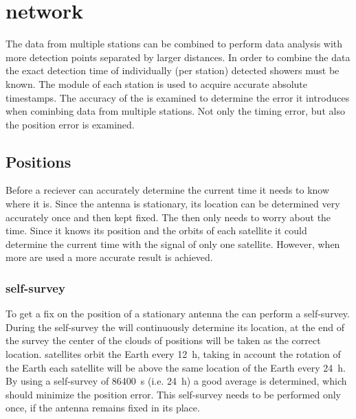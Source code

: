 \chapter{\hisparc network}
\label{ch:cluster}

The data from multiple \hisparc stations can be combined to perform data analysis with more detection points separated by larger distances. In order to combine the data the exact detection time of individually (per station) detected showers must be known. The \gps module of each station is used to acquire accurate absolute timestamps. The accuracy of the \gps is examined to determine the error it introduces when cominbing data from multiple stations. Not only the timing error, but also the position error is examined.


\section{Positions}

Before a \gps reciever can accurately determine the current time it needs to know where it is. Since the \gps antenna is stationary, its location can be determined very accurately once and then kept fixed. The \gps then only needs to worry about the time. Since it knows its position and the orbits of each \gps satellite it could determine the current time with the signal of only one \gps satellite. However, when more are used a more accurate result is achieved.


\subsection{\gps self-survey}

To get a fix on the position of a stationary \gps antenna the \gps can perform a self-survey. During the self-survey the \gps will continuously determine its location, at the end of the survey the center of the clouds of positions will be taken as the correct location. \gps satellites orbit the Earth every \SI{12}{\hour}, taking in account the rotation of the Earth each \gps satellite will be above the same location of the Earth every \SI{24}{\hour}. By using a self-survey of \SI{86400}{\second} (i.e. \SI{24}{\hour}) a good average is determined, which should minimize the position error. This self-survey needs to be performed only once, if the \gps antenna remains fixed in its place.

